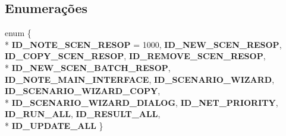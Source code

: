 \subsection*{Enumerações}
\begin{DoxyCompactItemize}
\item 
enum \{ \\*
{\bf I\+D\+\_\+\+N\+O\+T\+E\+\_\+\+S\+C\+E\+N\+\_\+\+R\+E\+S\+OP} = 1000, 
{\bf I\+D\+\_\+\+N\+E\+W\+\_\+\+S\+C\+E\+N\+\_\+\+R\+E\+S\+OP}, 
{\bf I\+D\+\_\+\+C\+O\+P\+Y\+\_\+\+S\+C\+E\+N\+\_\+\+R\+E\+S\+OP}, 
{\bf I\+D\+\_\+\+R\+E\+M\+O\+V\+E\+\_\+\+S\+C\+E\+N\+\_\+\+R\+E\+S\+OP}, 
\\*
{\bf I\+D\+\_\+\+N\+E\+W\+\_\+\+S\+C\+E\+N\+\_\+\+B\+A\+T\+C\+H\+\_\+\+R\+E\+S\+OP}, 
{\bf I\+D\+\_\+\+N\+O\+T\+E\+\_\+\+M\+A\+I\+N\+\_\+\+I\+N\+T\+E\+R\+F\+A\+CE}, 
{\bf I\+D\+\_\+\+S\+C\+E\+N\+A\+R\+I\+O\+\_\+\+W\+I\+Z\+A\+RD}, 
{\bf I\+D\+\_\+\+S\+C\+E\+N\+A\+R\+I\+O\+\_\+\+W\+I\+Z\+A\+R\+D\+\_\+\+C\+O\+PY}, 
\\*
{\bf I\+D\+\_\+\+S\+C\+E\+N\+A\+R\+I\+O\+\_\+\+W\+I\+Z\+A\+R\+D\+\_\+\+D\+I\+A\+L\+OG}, 
{\bf I\+D\+\_\+\+N\+E\+T\+\_\+\+P\+R\+I\+O\+R\+I\+TY}, 
{\bf I\+D\+\_\+\+R\+U\+N\+\_\+\+A\+LL}, 
{\bf I\+D\+\_\+\+R\+E\+S\+U\+L\+T\+\_\+\+A\+LL}, 
\\*
{\bf I\+D\+\_\+\+U\+P\+D\+A\+T\+E\+\_\+\+A\+LL}
 \}
\end{DoxyCompactItemize}

